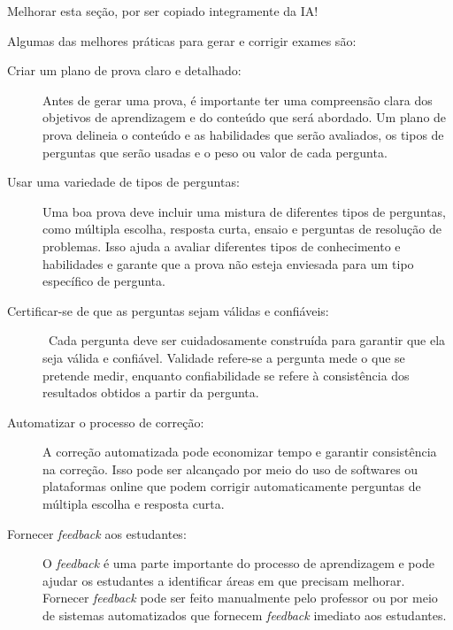 {\color{red} Melhorar esta seção, por ser copiado integramente da IA!}

Algumas das melhores práticas para gerar e corrigir exames são:

\begin{description}

\item[Criar um plano de prova claro e detalhado:] Antes de gerar uma prova, é importante ter uma compreensão clara dos objetivos de aprendizagem e do conteúdo que será abordado. Um plano de prova delineia o conteúdo e as habilidades que serão avaliados, os tipos de perguntas que serão usadas e o peso ou valor de cada pergunta.

\item[Usar uma variedade de tipos de perguntas:] Uma boa prova deve incluir uma mistura de diferentes tipos de perguntas, como múltipla escolha, resposta curta, ensaio e perguntas de resolução de problemas. Isso ajuda a avaliar diferentes tipos de conhecimento e habilidades e garante que a prova não esteja enviesada para um tipo específico de pergunta.

\item [Certificar-se de que as perguntas sejam válidas e confiáveis:] \ Cada pergunta deve ser cuidadosamente construída para garantir que ela seja válida e confiável. Validade refere-se a pergunta mede o que se pretende medir, enquanto confiabilidade se refere à consistência dos resultados obtidos a partir da pergunta.


\item [Automatizar o processo de correção:] A correção automatizada pode economizar tempo e garantir consistência na correção. Isso pode ser alcançado por meio do uso de softwares ou plataformas online que podem corrigir automaticamente perguntas de múltipla escolha e resposta curta.

\item [Fornecer \textit{feedback} aos estudantes:] O \textit{feedback} é uma parte importante do processo de aprendizagem e pode ajudar os estudantes a identificar áreas em que precisam melhorar. Fornecer \textit{feedback} pode ser feito manualmente pelo professor ou por meio de sistemas automatizados que fornecem \textit{feedback} imediato aos estudantes.
\end{description}


